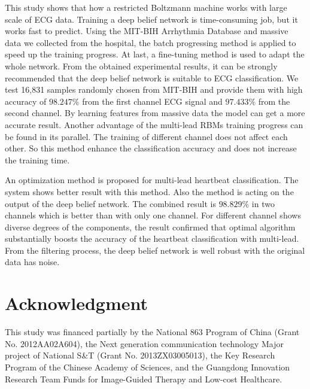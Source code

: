 \documentclass[conference]{IEEEtran}
\begin{document}
This study shows that how a restricted Boltzmann machine works with large scale of ECG data.  Training a deep belief network is time-consuming job, but it works fast to predict. Using the MIT-BIH Arrhythmia Database \cite{Goldberger} and massive data we collected from the hospital, the batch progressing method is applied to speed up the training progress. At last, a fine-tuning method is used to adapt the whole network. From the obtained experimental results, it can be strongly recommended that the deep belief network is suitable to ECG classification. We test 16,831 samples randomly chosen from MIT-BIH and provide them with high accuracy of $98.247\%$ from the first channel ECG signal and $97.433\%$ from the second channel. By learning features from massive data the model can get a more accurate result. Another advantage of the multi-lead RBMs training progress can be found in its parallel. The training of different channel does not affect each other. So this method enhance the classification accuracy and does not increase the training time.

An optimization method is proposed for multi-lead heartbeat classification. The system shows better result with this method. Also the method is acting on the output of the deep belief network. The combined result is $98.829\%$ in two channels which is better than with only one channel. For different channel shows diverse degrees of the components, the result confirmed that optimal algorithm substantially boosts the accuracy of the heartbeat classification with multi-lead. From the filtering process, the deep belief network is well robust with the original data has noise. 

\section*{Acknowledgment}
This study was financed partially by the National 863 Program of China (Grant No. 2012AA02A604), the Next generation communication technology Major project of National S\&T (Grant No. 2013ZX03005013), the Key Research Program of the Chinese Academy of Sciences, and the Guangdong Innovation Research Team Funds for Image-Guided Therapy and Low-cost Healthcare. 
\end{document}
